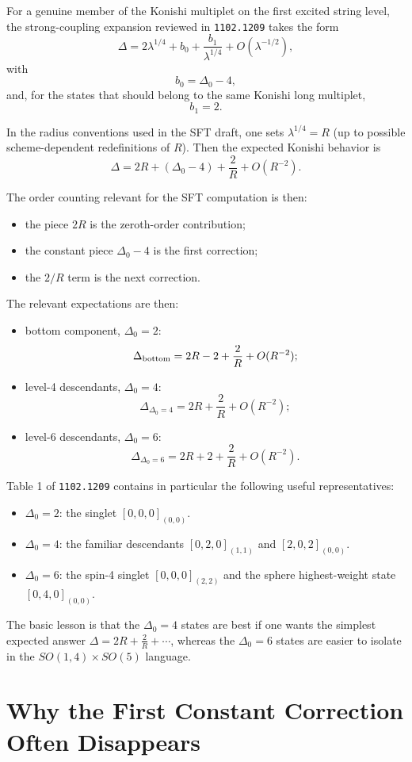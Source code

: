 \documentclass[12pt]{article}
\def\be{\begin{equation}}
\def\ee{\end{equation}}
\newcommand{\D}{\ensuremath{\Delta}}
\begin{document}
For a genuine member of the Konishi multiplet on the first excited string level, the strong-coupling
expansion reviewed in \texttt{1102.1209} takes the form
\be
\D = 2\lambda^{1/4}+b_0+\frac{b_1}{\lambda^{1/4}}+O(\lambda^{-1/2}),
\ee
with
\be
b_0=\D_0-4,
\ee
and, for the states that should belong to the same Konishi long multiplet,
\be
b_1=2.
\ee

In the radius conventions used in the SFT draft, one sets $\lambda^{1/4}=R$ (up to possible
scheme-dependent redefinitions of $R$). Then the expected Konishi behavior is
\be
\D = 2R+(\D_0-4)+\frac{2}{R}+O(R^{-2}).
\ee

The order counting relevant for the SFT computation is then:
\begin{itemize}
\item the piece $2R$ is the zeroth-order contribution;
\item the constant piece $\D_0-4$ is the first correction;
\item the $2/R$ term is the next correction.
\end{itemize}

The relevant expectations are then:
\begin{itemize}
\item bottom component, $\D_0=2$:
\be
\D_{\rm bottom}=2R-2+\frac{2}{R}+O(R^{-2});
\ee
\item level-4 descendants, $\D_0=4$:
\be
\D_{\D_0=4}=2R+\frac{2}{R}+O(R^{-2});
\ee
\item level-6 descendants, $\D_0=6$:
\be
\D_{\D_0=6}=2R+2+\frac{2}{R}+O(R^{-2}).
\ee
\end{itemize}

Table 1 of \texttt{1102.1209} contains in particular the following useful representatives:
\begin{itemize}
\item $\D_0=2$: the singlet $[0,0,0]_{(0,0)}$.
\item $\D_0=4$: the familiar descendants $[0,2,0]_{(1,1)}$ and $[2,0,2]_{(0,0)}$.
\item $\D_0=6$: the spin-4 singlet $[0,0,0]_{(2,2)}$ and the sphere highest-weight state
$[0,4,0]_{(0,0)}$.
\end{itemize}

The basic lesson is that the $\D_0=4$ states are best if one wants the simplest expected answer
$\D=2R+\frac{2}{R}+\cdots$, whereas the $\D_0=6$ states are easier to isolate in the
$SO(1,4)\times SO(5)$ language.

\section{Why the First Constant Correction Often Disappears}
\end{document}

